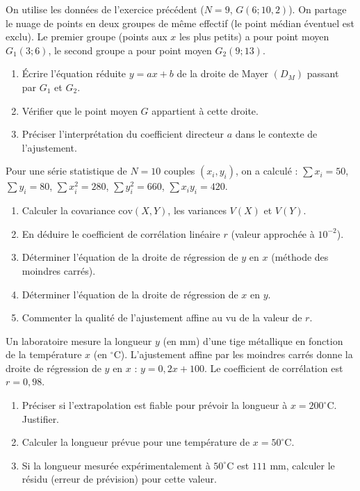 \documentclass[11pt]{article}
\begin{document}
\begin{exercice}
On utilise les données de l'exercice précédent ($N=9$, $G(6; 10,2)$). On partage le nuage de points en deux groupes de même effectif (le point médian éventuel est exclu). Le premier groupe (points aux $x$ les plus petits) a pour point moyen $G_1(3; 6)$, le second groupe a pour point moyen $G_2(9; 13)$.

\begin{enumerate}
    \item Écrire l'équation réduite $y = ax + b$ de la droite de Mayer $(D_M)$ passant par $G_1$ et $G_2$.
    \item Vérifier que le point moyen $G$ appartient à cette droite.
    \item Préciser l'interprétation du coefficient directeur $a$ dans le contexte de l'ajustement.
\end{enumerate}
\end{exercice}

\begin{exercice}
Pour une série statistique de $N=10$ couples $(x_i, y_i)$, on a calculé :
$\sum x_i = 50$, $\sum y_i = 80$, $\sum x_i^2 = 280$, $\sum y_i^2 = 660$, $\sum x_i y_i = 420$.

\begin{enumerate}
    \item Calculer la covariance $\text{cov}(X,Y)$, les variances $V(X)$ et $V(Y)$.
    \item En déduire le coefficient de corrélation linéaire $r$ (valeur approchée à $10^{-2}$).
    \item Déterminer l'équation de la droite de régression de $y$ en $x$ (méthode des moindres carrés).
    \item Déterminer l'équation de la droite de régression de $x$ en $y$.
    \item Commenter la qualité de l'ajustement affine au vu de la valeur de $r$.
\end{enumerate}
\end{exercice}

\begin{exercice}
Un laboratoire mesure la longueur $y$ (en mm) d'une tige métallique en fonction de la température $x$ (en $^\circ$C). L'ajustement affine par les moindres carrés donne la droite de régression de $y$ en $x$ : $y = 0,2x + 100$. Le coefficient de corrélation est $r = 0,98$.

\begin{enumerate}
    \item Préciser si l'extrapolation est fiable pour prévoir la longueur à $x = 200^\circ$C. Justifier.
    \item Calculer la longueur prévue pour une température de $x = 50^\circ$C.
    \item Si la longueur mesurée expérimentalement à $50^\circ$C est $111$ mm, calculer le résidu (erreur de prévision) pour cette valeur.
\end{enumerate}
\end{exercice}
\end{document}
